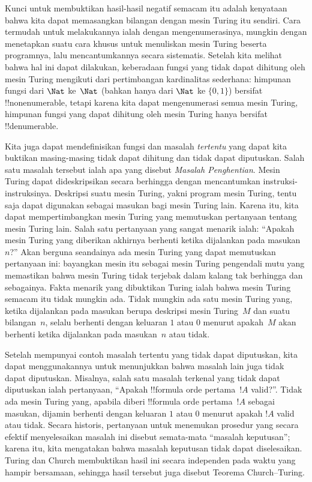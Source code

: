 \documentclass[../../../include/open-logic-section]{subfiles}
\begin{document}
Kunci untuk membuktikan hasil-hasil negatif semacam itu adalah kenyataan bahwa
kita dapat memasangkan bilangan dengan mesin Turing itu sendiri. Cara termudah
untuk melakukannya ialah dengan mengenumerasinya, mungkin dengan menetapkan
suatu cara khusus untuk menuliskan mesin Turing beserta programnya, lalu
mencantumkannya secara sistematis. Setelah kita melihat bahwa hal ini dapat
dilakukan, keberadaan fungsi yang tidak dapat dihitung oleh mesin Turing
mengikuti dari pertimbangan kardinalitas sederhana: himpunan fungsi dari
$\Nat$ ke~$\Nat$ (bahkan hanya dari $\Nat$ ke $\{0, 1\}$) bersifat
!!{nonenumerable}, tetapi karena kita dapat mengenumerasi semua mesin Turing,
himpunan fungsi yang dapat dihitung oleh mesin Turing hanya bersifat
!!{denumerable}.

Kita juga dapat mendefinisikan fungsi dan masalah \emph{tertentu} yang dapat
kita buktikan masing-masing tidak dapat dihitung dan tidak dapat diputuskan.
Salah satu masalah tersebut ialah apa yang disebut \emph{Masalah Penghentian}.
Mesin Turing dapat dideskripsikan secara berhingga dengan mencantumkan
instruksi-instruksinya. Deskripsi suatu mesin Turing, yakni program mesin
Turing, tentu saja dapat digunakan sebagai masukan bagi mesin Turing lain.
Karena itu, kita dapat mempertimbangkan mesin Turing yang memutuskan pertanyaan
tentang mesin Turing lain. Salah satu pertanyaan yang sangat menarik ialah:
``Apakah mesin Turing yang diberikan akhirnya berhenti ketika dijalankan pada
masukan~$n$?'' Akan berguna seandainya ada mesin Turing yang dapat memutuskan
pertanyaan ini: bayangkan mesin itu sebagai mesin Turing pengendali mutu yang
memastikan bahwa mesin Turing tidak terjebak dalam kalang tak berhingga dan
sebagainya. Fakta menarik yang dibuktikan Turing ialah bahwa mesin Turing
semacam itu tidak mungkin ada. Tidak mungkin ada satu mesin Turing yang, ketika
dijalankan pada masukan berupa deskripsi mesin Turing~$M$ dan suatu
bilangan~$n$, selalu berhenti dengan keluaran $1$ atau $0$ menurut apakah~$M$
akan berhenti ketika dijalankan pada masukan~$n$ atau tidak.

Setelah mempunyai contoh masalah tertentu yang tidak dapat diputuskan, kita
dapat menggunakannya untuk menunjukkan bahwa masalah lain juga tidak dapat
diputuskan. Misalnya, salah satu masalah terkenal yang tidak dapat diputuskan
ialah pertanyaan, ``Apakah !!{formula} orde pertama~$!A$ valid?''. Tidak ada
mesin Turing yang, apabila diberi !!{formula} orde pertama~$!A$ sebagai
masukan, dijamin berhenti dengan keluaran $1$ atau $0$ menurut apakah $!A$
valid atau tidak. Secara historis, pertanyaan untuk menemukan prosedur yang
secara efektif menyelesaikan masalah ini disebut semata-mata ``masalah
keputusan''; karena itu, kita mengatakan bahwa masalah keputusan tidak dapat
diselesaikan. Turing dan Church membuktikan hasil ini secara independen pada
waktu yang hampir bersamaan, sehingga hasil tersebut juga disebut Teorema
Church--Turing.
\end{document}
